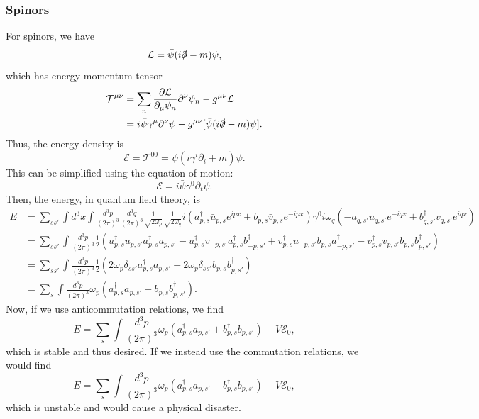 \documentclass[11pt]{article}
\theoremstyle{definition}
\begin{document}
\subsubsection{Spinors}
For spinors, we have
\begin{equation}
    \mathcal{L} =  \bar{\psi}(i\slashed{\partial}-m)\psi,
\end{equation}
which has energy-momentum tensor
\begin{equation}
    \begin{aligned}
        \mathcal{T}^{\mu\nu} &= \sum_n \frac{\partial\mathcal{L}}{\partial_\mu\psi_n}\partial^\nu\psi_n - g^{\mu\nu}\mathcal{L} \\
        &= i\bar{\psi}\gamma^\mu\partial^\nu\psi - g^{\mu\nu}[\bar{\psi}(i\slashed{\partial}-m)\psi].
    \end{aligned}
\end{equation}
Thus, the energy density is 
\begin{equation}
    \mathcal{E} = \mathcal{T}^{00} = \bar{\psi}(i\gamma^i\partial_i+m)\psi.
\end{equation}
This can be simplified using the equation of motion:
\begin{equation}
    \mathcal{E} = i\bar{\psi}\gamma^0\partial_t\psi.
\end{equation}
Then, the energy, in quantum field theory, is
\begin{equation}
    \begin{aligned}
        E &= \sum_{ss'}\int d^3x \int \frac{d^3p}{(2\pi)^3}\frac{d^3q}{(2\pi)^3}\frac{1}{\sqrt{2\omega_p}}\frac{1}{\sqrt{2\omega_q}}i(a_{p,s}^\dagger\bar{u}_{p,s}e^{ipx} + b_{p,s}\bar{v}_{p,s}e^{-ipx})\gamma^0i\omega_q(-a_{q,s'}u_{q,s'}e^{-iqx} + b_{q,s'}^\dagger v_{q,s'} e^{iqx})\\
        &= \sum_{ss'} \int \frac{d^3p}{(2\pi)^3}\frac{1}{2}(u_{p,s}^\dagger u_{p,s'}a_{p,s}^\dagger a_{p,s'} - u_{p,s}^\dagger v_{-p,s'}a_{p,s}^\dagger b_{-p,s'}^\dagger + v_{p,s}^\dagger u_{-p,s'}b_{p,s} a_{-p,s'}^\dagger -v_{p,s}^\dagger v_{p,s'}b_{p,s} b_{p,s'}^\dagger)\\
        &= \sum_{ss'} \int \frac{d^3p}{(2\pi)^3}\frac{1}{2}(2\omega_p\delta_{ss'}a_{p,s}^\dagger a_{p,s'} -2\omega_p\delta_{ss'}b_{p,s} b_{p,s'}^\dagger)\\
        &= \sum_s\int \frac{d^3p}{(2\pi)^3}\omega_p (a_{p,s}^\dagger a_{p,s'} - b_{p,s} b_{p,s'}^\dagger).
    \end{aligned}
\end{equation}
Now, if we use anticommutation relations, we find
\begin{equation}
    E = \sum_s\int \frac{d^3p}{(2\pi)^3}\omega_p (a_{p,s}^\dagger a_{p,s'} + b_{p,s}^\dagger b_{p,s'}) -V\mathcal{E}_0,
\end{equation}
which is stable and thus desired.
If we instead use the commutation relations, we would find
\begin{equation}
    E = \sum_s\int \frac{d^3p}{(2\pi)^3}\omega_p (a_{p,s}^\dagger a_{p,s'} - b_{p,s}^\dagger b_{p,s'}) -V\mathcal{E}_0, 
\end{equation}
which is unstable and would cause a physical disaster. 
\end{document}
